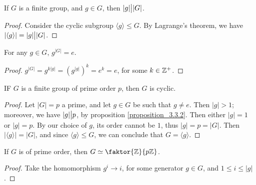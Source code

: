 \begin{proposition}\label{proposition_3.3.2}
  If $G$ is a finite group, and  $g \in G$, then $|g| \big{|} |G|$.
\end{proposition}
\begin{proof}
  Consider the cyclic subgroup $\langle g \rangle \leq G$. By
  Lagrange's theorem, we have $|\langle g \rangle|=|g| \big{|} |G|$.
\end{proof}
\begin{corollary}
  For any $g \in G$, $g^{|G|}=e$.
\end{corollary}
\begin{proof}
  $g^{|G|}=g^{k|g|}=(g^{|g|})^k=e^k=e$, for some $k \in \mathbb{Z}^+$.
\end{proof}

\begin{proposition}\label{proposition_3.3.3}
  IF $G$ is a finite group of prime order $p$, then $G$ is cyclic.
\end{proposition}
\begin{proof}
  Let $|G|=p$ a prime, and let $g \in G$ be such that $g \neq e$. Then
  $|g|>1$; moreover, we have $|g| \big{|} p$, by proposition \ref{proposition_3.3.2}. Then
  either $|g|=1$ or $|g|=p$. By our choice of $g$, its order cannot be
  $1$, thus  $|g|=p=|G|$. Then $|\langle g \rangle|=|G|$, and since
  $\langle g \rangle \leq G$, we can conclude that $G=\langle g \rangle$.
\end{proof}
\begin{corollary}
  If $G$ is of prime order, then  $G \simeq \faktor{\Z}{p\Z}$.
\end{corollary}
\begin{proof}
  Take the homomorphism $g^i \rightarrow i$, for some generator $g \in G$, and
  $1 \leq i \leq |g|$.
\end{proof}

